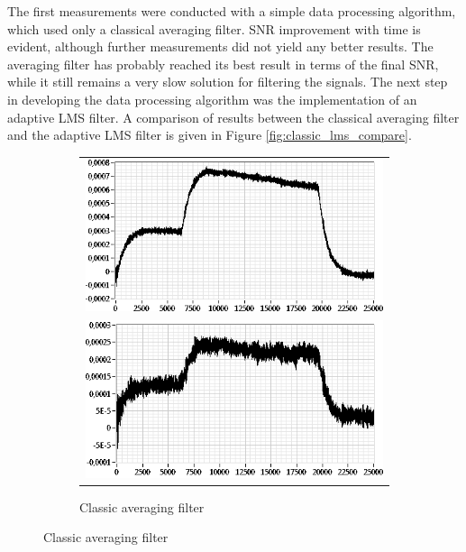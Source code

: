 \documentclass{standalone}
\begin{document}
The first measurements were conducted with a simple data processing algorithm, which used only a classical averaging filter. SNR improvement with time is evident, although further measurements did not yield any better results. The averaging filter has probably reached its best result in terms of the final SNR, while it still remains a very slow solution for filtering the signals. The next step in developing the data processing algorithm was the implementation of an adaptive LMS filter. A comparison of results between the classical averaging filter and the adaptive LMS filter is given in Figure \ref{fig:classic_lms_compare}.
\begin{figure}[h]
	\begin{subfigure}[b]{0.49\textwidth}
		\begin{tabular}{c}
			\includegraphics[width=\textwidth]{classic_lms_compare_stokes_classic.png} \vspace{1em} \\
			\includegraphics[width=\textwidth]{classic_lms_compare_antistokes_classic.png}
		\end{tabular}
		\caption{Classic averaging filter}
	\end{subfigure}

\end{figure}
\end{document}

